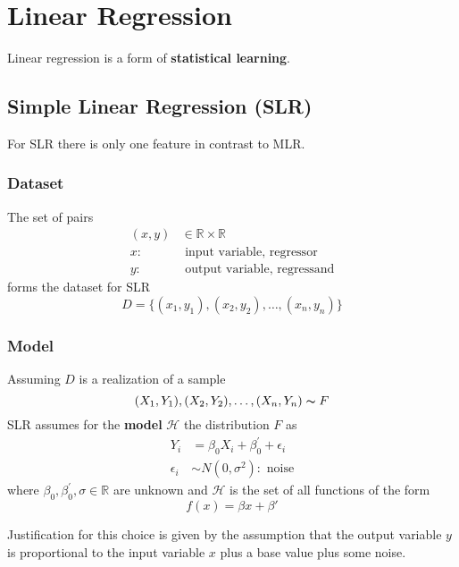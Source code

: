 \section{Linear Regression}
Linear regression is a form of \textbf{statistical learning}.
\subsection{Simple Linear Regression (SLR)}
For SLR there is only one feature in contrast to MLR.

\subsubsection{Dataset}
The set of pairs
\begin{align*}
    (x,y) & \in\mathbb{R}\times\mathbb{R}       \\
    x:    & \text{ input variable, regressor}   \\
    y:    & \text{ output variable, regressand}
\end{align*}
forms the dataset for SLR
\begin{equation*}
    D=\{(x_1,y_1),(x_2,y_2),\dots,(x_n,y_n)\}
\end{equation*}

\subsubsection{Model}
Assuming $D$ is a realization of a sample
\begin{equation*}
    (X_1,Y_1),(X_2,Y_2),\dots,(X_n,Y_n)\thicksim F
\end{equation*}
SLR assumes for the \textbf{model} $\mathcal{H}$ the distribution $F$ as
\begin{align*}
    Y_i        & =\beta_0X_i+\beta^{\prime}_0+\epsilon_i \\
    \epsilon_i & \sim N(0,\sigma^2): \text{ noise}
\end{align*}
where $\beta_0,\beta^{\prime}_0,\sigma\in\mathbb{R}$ are unknown and $\mathcal{H}$ is the set of all functions of the form
\begin{equation*}
    f(x)=\beta x+\beta'
\end{equation*}


Justification for this choice is given by the assumption that the output variable $y$ is proportional to the input variable $x$ plus a base value plus some noise.


